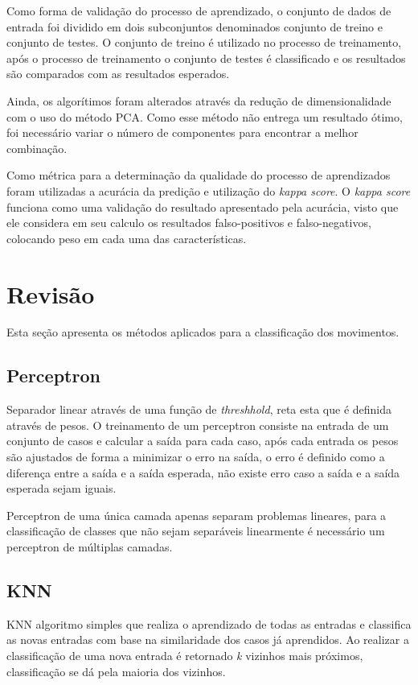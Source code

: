 \documentclass[12pt]{article}
\begin{document}
	Como forma de validação do processo de aprendizado, o conjunto de dados de entrada foi dividido em dois subconjuntos denominados conjunto de treino e conjunto de testes. O conjunto de treino é utilizado no processo de treinamento, após o processo de treinamento o conjunto de testes é classificado e os resultados são comparados com as resultados esperados.
	
	Ainda, os algorítimos foram alterados através da redução de dimensionalidade com o uso do método PCA. Como esse método não entrega um resultado ótimo, foi necessário variar o número de componentes para encontrar a melhor combinação.

	Como métrica para a determinação da qualidade do processo de aprendizados foram utilizadas a acurácia da predição e utilização do \emph{kappa score}. O \textit{kappa score} funciona como uma validação do resultado apresentado pela acurácia, visto que ele considera em seu calculo os resultados falso-positivos e falso-negativos, colocando peso em cada uma das características. 

\section{Revisão}

	Esta seção apresenta os métodos aplicados para a classificação dos movimentos.

\subsection{Perceptron}

	Separador linear através de uma função de \emph{threshhold}, reta esta que é definida através de pesos. O treinamento de um perceptron consiste na entrada de um conjunto de casos e calcular a saída para cada caso, após cada entrada os pesos são ajustados de forma a minimizar o erro na saída, o erro é definido como a diferença entre a saída e a saída esperada, não existe erro caso a saída e a saída esperada sejam iguais.
	
	Perceptron de uma única camada apenas separam problemas lineares, para a classificação de classes que não sejam separáveis linearmente é necessário um perceptron de múltiplas camadas.
	
\subsection{KNN}

	KNN algoritmo simples que realiza o aprendizado de todas as entradas e classifica as novas entradas com base na similaridade dos casos já aprendidos. Ao realizar a classificação de uma nova entrada é retornado \emph{k} vizinhos mais próximos, classificação se dá pela maioria dos vizinhos.
	
\end{document}
